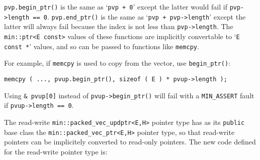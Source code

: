 \documentclass[12pt]{article}
\newcommand{\EOL}{\penalty \exhyphenpenalty}
\newcommand{\BRACKETED}[1]{{\tt <#1>}}
\newcommand{\EARG}{\BRACKETED{{E,H}}}
\newenvironment{indpar}[1][0.3in]%
	{\begin{list}{}%
		     {\setlength{\itemsep}{0in}%
		      \setlength{\topsep}{0in}%
		      \setlength{\parsep}{1ex}%
		      \setlength{\labelwidth}{#1}%
		      \setlength{\leftmargin}{#1}%
		      \addtolength{\leftmargin}{\labelsep}}%
	 \item}%
	{\end{list}}
\begin{document}
\verb|pvp.begin_ptr()| is the same as `\verb|pvp + 0|'
except the latter would fail if {\tt pvp->\EOL length == 0}.
\verb|pvp.end_ptr()| is the same as `\verb|pvp + pvp->length|'
except the latter will always fail because the index is not less than
\verb|pvp->length|.
The {\tt min::ptr<E const>} values of these functions are implicitly
convertable to `{\tt E const *}' values, and so can be passed to
functions like {\tt memcpy}.

For example, if \verb|memcpy| is used to copy
from the vector, use {\tt begin\_\EOL ptr()}:
\begin{indpar}\begin{verbatim}
memcpy ( ..., pvup.begin_ptr(), sizeof ( E ) * pvup->length );
\end{verbatim}\end{indpar}
Using \verb|& pvup[0]| instead of \verb|pvup->begin_ptr()|
will fail with a {\tt MIN\_\EOL ASSERT} fault if {\tt pvup->\EOL length == 0}.

The read-write {\tt min::\EOL packed\_\EOL vec\_\EOL updptr\EARG}
pointer type has as its {\tt public} base class the
{\tt min::\EOL packed\_\EOL vec\_\EOL ptr\EARG} pointer type,
so that read-write pointers can be implicitely converted to
read-only pointers.  The new code defined for the read-write
pointer type is:
\end{document}
